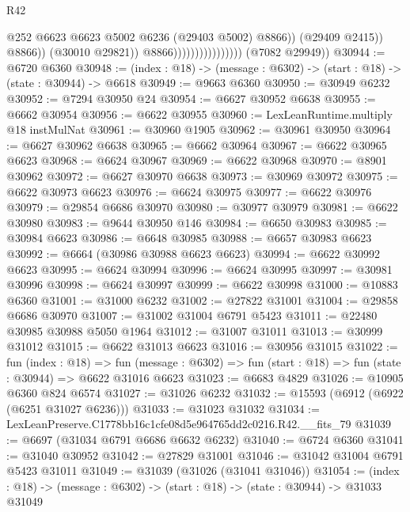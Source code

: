 \begin{lexlean}{R42}
\begin{coremodule}
{                                                  @252
                                                  @6623
                                                  @6623
                                                  @5002
                                                  @6236
                                                  (@29403 @5002)
                                                  @8866))
                                              (@29409 @2415))
                                            @8866))
                                        (@30010 @29821))
                                      @8866))))))))))))))))
      (@7082 @29949))
@30944 := @6720 @6360
@30948 := (index : @18) -> (message : @6302) -> (start : @18) -> (state : @30944) -> @6618
@30949 := @9663 @6360
@30950 := @30949 @6232
@30952 := @7294 @30950 @24
@30954 := @6627 @30952 @6638
@30955 := @6662 @30954
@30956 := @6622 @30955
@30960 := LexLeanRuntime.multiply @18 instMulNat
@30961 := @30960 @1905
@30962 := @30961 @30950
@30964 := @6627 @30962 @6638
@30965 := @6662 @30964
@30967 := @6622 @30965 @6623
@30968 := @6624 @30967
@30969 := @6622 @30968
@30970 := @8901 @30962
@30972 := @6627 @30970 @6638
@30973 := @30969 @30972
@30975 := @6622 @30973 @6623
@30976 := @6624 @30975
@30977 := @6622 @30976
@30979 := @29854 @6686 @30970
@30980 := @30977 @30979
@30981 := @6622 @30980
@30983 := @9644 @30950 @146
@30984 := @6650 @30983
@30985 := @30984 @6623
@30986 := @6648 @30985
@30988 := @6657 @30983 @6623
@30992 := @6664 (@30986 @30988 @6623 @6623)
@30994 := @6622 @30992 @6623
@30995 := @6624 @30994
@30996 := @6624 @30995
@30997 := @30981 @30996
@30998 := @6624 @30997
@30999 := @6622 @30998
@31000 := @10883 @6360
@31001 := @31000 @6232
@31002 := @27822 @31001
@31004 := @29858 @6686 @30970
@31007 := @31002 @31004 @6791 @5423
@31011 := @22480 @30985 @30988 @5050 @1964
@31012 := @31007 @31011
@31013 := @30999 @31012
@31015 := @6622 @31013 @6623
@31016 := @30956 @31015
@31022 := fun (index : @18) =>
  fun (message : @6302) => fun (start : @18) => fun (state : @30944) => @6622 @31016 @6623
@31023 := @6683 @4829
@31026 := @10905 @6360 @824 @6574
@31027 := @31026 @6232
@31032 := @15593 (@6912 (@6922 (@6251 @31027 @6236)))
@31033 := @31023 @31032
@31034 := LexLeanPreserve.C1778bb16c1cfe08d5e964765dd2c0216.R42.__fits_79
@31039 := @6697 (@31034 @6791 @6686 @6632 @6232)
@31040 := @6724 @6360
@31041 := @31040 @30952
@31042 := @27829 @31001
@31046 := @31042 @31004 @6791 @5423 @31011
@31049 := @31039 (@31026 (@31041 @31046))
@31054 := (index : @18) -> (message : @6302) -> (start : @18) -> (state : @30944) -> @31033 @31049
}
\end{coremodule}
\end{lexlean}
